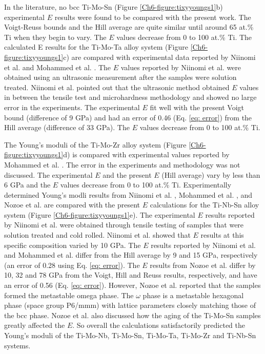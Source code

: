 In the literature, no bcc Ti-Mo-Sn (Figure \ref{Ch6-figure:tixyyoungs1}b) experimental $E$ results were found to be compared with the present work. The Voigt-Reuss bounds and the Hill average are quite similar until around 65 at.\% Ti when they begin to vary. The $E$ values decrease from 0 to 100 at.\% Ti. The calculated E results for the Ti-Mo-Ta alloy system (Figure \ref{Ch6-figure:tixyyoungs1}c) are compared with experimental data reported by Niinomi et al. \cite{Niinomi2012} and Mohammed et al. \cite{Mohammed2014}. The $E$ values reported by Niinomi et al. \cite{Niinomi2012} were obtained using an ultrasonic measurement after the samples were solution treated. Niinomi et al. \cite{Niinomi2012} pointed out that the ultrasonic method obtained $E$ values in between the tensile test and microhardness methodology and showed no large error in the experiments. The experimental $E$ fit well with the present Voigt bound (difference of 9 GPa) and had an error of 0.46 (Eq. \ref{eq: error}) from the Hill average (difference of 33 GPa). The $E$ values decrease from 0 to 100 at.\% Ti. 

The Young's moduli of the Ti-Mo-Zr alloy system (Figure \ref{Ch6-figure:tixyyoungs1}d) is compared with experimental values reported by Mohammed et al. \cite{Mohammed2014}. The error in the experiments and methodology was not discussed. The experimental $E$ \cite{Mohammed2014} and the present $E$ (Hill average) vary by less than 6 GPa and the $E$ values decrease from 0 to 100 at.\% Ti. Experimentally determined Young's modli results from Niinomi et al. \cite{Niinomi2012}, Mohammed et al. \cite{Mohammed2014}, and Nozoe et al. \cite{Nozoe2007} are compared with the present $E$ calculations for the Ti-Nb-Sn alloy system (Figure \ref{Ch6-figure:tixyyoungs1}e). The experimental $E$ results reported by Niinomi et al. \cite{Niinomi2012} were obtained through tensile testing of samples that were solution treated and cold rolled. Niinomi et al. showed that $E$ results at this specific composition varied by 10 GPa. The $E$ results reported by Niinomi et al. \cite{Niinomi2012} and Mohammed et al. \cite{Mohammed2014} differ from the Hill average by 9 and 15 GPa, respectively (an error of 0.28 using Eq. \ref{eq: error}). The $E$ results from Nozoe et al. \cite{Nozoe2007} differ by 10, 32 and 78 GPa from the Voigt, Hill and Reuss results, respectively, and have an error of 0.56 (Eq. \ref{eq: error}). However, Nozoe et al. reported that the samples formed the metastable omega phase. The $\omega$ phase is a metastable hexagonal phase (space group P6/mmm) with lattice parameters closely matching those of the bcc phase. Nozoe et al. \cite{Nozoe2007} also discussed how the aging of the Ti-Mo-Sn samples greatly affected the $E$. So overall the calculations satisfactorily predicted the Young's moduli of the Ti-Mo-Nb, Ti-Mo-Sn, Ti-Mo-Ta, Ti-Mo-Zr and Ti-Nb-Sn systems. 

